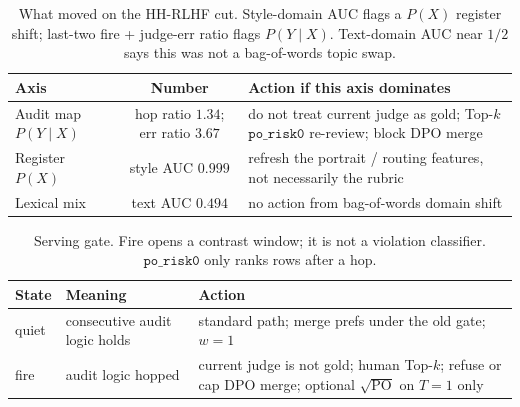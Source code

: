\begin{table}[ht]
\centering
\caption{What moved on the HH-RLHF cut. Style-domain AUC flags a \(P(X)\)
register shift; last-two fire + judge-err ratio flags \(P(Y\mid X)\).
Text-domain AUC near \(1/2\) says this was not a bag-of-words topic swap.}
\label{tab:llm-audit-axes}
\small
\begin{tabular}{@{}l c l@{}}
\toprule
Axis & Number & Action if this axis dominates \\
\midrule
Audit map \(P(Y\mid X)\) & hop ratio \(1.34\); err ratio \(3.67\) &
do not treat current judge as gold; Top-\(k\) \(\texttt{po\_risk0}\) re-review; block DPO merge \\
Register \(P(X)\) & style AUC \(0.999\) &
refresh the portrait / routing features, not necessarily the rubric \\
Lexical mix & text AUC \(0.494\) &
no action from bag-of-words domain shift \\
\bottomrule
\end{tabular}
\end{table}

\begin{table}[ht]
\centering
\caption{Serving gate. Fire opens a contrast window; it is not a
violation classifier. \(\texttt{po\_risk0}\) only ranks rows after a hop.}
\label{tab:llm-audit-gate}
\small
\begin{tabular}{@{}l p{5.4cm} p{5.4cm}@{}}
\toprule
State & Meaning & Action \\
\midrule
quiet & consecutive audit logic holds &
standard path; merge prefs under the old gate; \(w=1\) \\
fire & audit logic hopped &
current judge is not gold; human Top-\(k\); refuse or cap DPO merge;
optional \(\sqrt{\mathrm{PO}}\) on \(T=1\) only \\
\bottomrule
\end{tabular}
\end{table}
